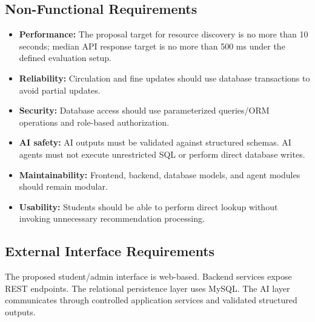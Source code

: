 \documentclass[12pt,a4paper]{report}
\begin{document}
\subsection{Non-Functional Requirements}
\begin{itemize}
\item \textbf{Performance:} The proposal target for resource discovery is no more than 10 seconds; median API response target is no more than 500 ms under the defined evaluation setup.
\item \textbf{Reliability:} Circulation and fine updates should use database transactions to avoid partial updates.
\item \textbf{Security:} Database access should use parameterized queries/ORM operations and role-based authorization.
\item \textbf{AI safety:} AI outputs must be validated against structured schemas. AI agents must not execute unrestricted SQL or perform direct database writes.
\item \textbf{Maintainability:} Frontend, backend, database models, and agent modules should remain modular.
\item \textbf{Usability:} Students should be able to perform direct lookup without invoking unnecessary recommendation processing.
\end{itemize}

\subsection{External Interface Requirements}
The proposed student/admin interface is web-based. Backend services expose REST endpoints. The relational persistence layer uses MySQL. The AI layer communicates through controlled application services and validated structured outputs.
\end{document}
